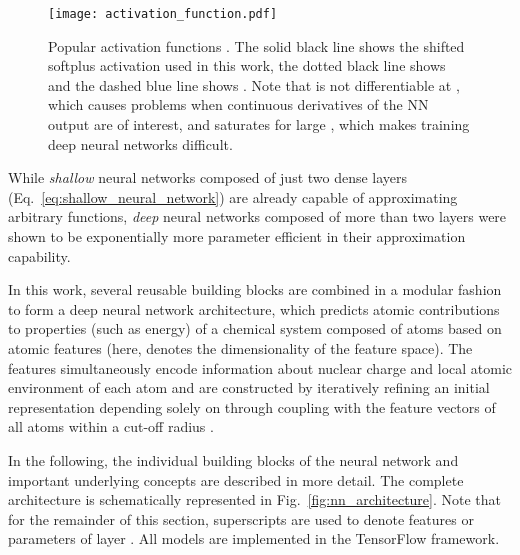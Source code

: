 \documentclass[12pt]{article}
\begin{document}
\begin{figure}[htbp]
\centering
\texttt{[image: activation\_function.pdf]}
\caption{Popular activation functions . The solid black
  line shows the shifted softplus activation used in this work, the
  dotted black line shows  and the dashed blue
  line shows . Note that  is not
  differentiable at , which causes problems when continuous derivatives of
  the NN output are of interest, and  saturates for large
  , which makes training deep neural networks
  difficult.}
\label{fig:activation_function}
\end{figure}

While \textit{shallow} neural networks composed of just two dense
layers (Eq.~\ref{eq:shallow_neural_network}) are already capable of
approximating arbitrary functions,\cite{chen1995universal}
\textit{deep} neural networks composed of more than two layers were
shown to be exponentially more parameter efficient in their
approximation capability.\cite{eldan2016power}

In this work, several reusable building blocks are combined in a
modular fashion to form a deep neural network architecture, which
predicts atomic contributions to properties (such as energy) of a
chemical system composed of  atoms based on atomic features
 (here,  denotes the
dimensionality of the feature space). The features simultaneously
encode information about nuclear charge  and local atomic
environment of each atom  and are constructed by iteratively
refining an initial representation depending solely on  through
coupling with the feature vectors  of all atoms  within a cut-off radius .

In the following, the individual building blocks of the neural network
and important underlying concepts are described in more detail. The
complete architecture is schematically represented in
Fig.~\ref{fig:nn_architecture}. Note that for the remainder of this
section, superscripts  are used to denote features or parameters of
layer . All models are implemented in the
TensorFlow\cite{tensorflow2015} framework.
\end{document}
